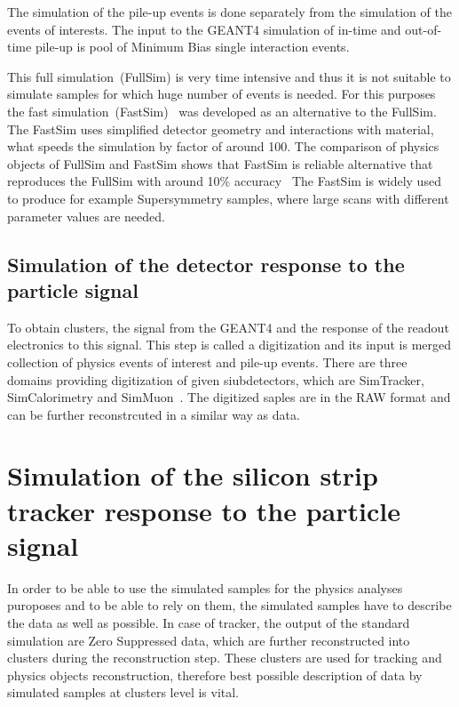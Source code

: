 The simulation of the pile-up events is done separately from the simulation of the events of interests. The input to  the GEANT4 simulation of in-time and out-of-time pile-up is pool of Minimum Bias single interaction events.

This full simulation~(FullSim) is very time intensive and thus it is not suitable to simulate samples for which huge number of events is needed. For this purposes the fast simulation~(FastSim)~\cite{Sekmen:2017hzs, CMS:2010spa, Giammanco:2014bza} was developed as an alternative to the FullSim. The FastSim uses simplified detector geometry and interactions with material, what speeds the simulation by factor of around 100. The comparison of physics objects of FullSim and FastSim shows that FastSim is reliable alternative that reproduces the FullSim with around 10\% accuracy~\cite{Abdullin:2011zz, Sekmen:2017hzs} The FastSim is widely used to produce for example Supersymmetry samples, where large scans with different parameter values are needed. 

\subsection{Simulation of the detector response to the particle signal}

To obtain clusters, the signal from the GEANT4 and the response of the readout electronics to this signal. This step is called a digitization and its input is merged collection of physics events of interest and pile-up events. There are three domains providing digitization of given siubdetectors, which are SimTracker, SimCalorimetry and SimMuon~\cite{iwebsite:simdigi}. The digitized saples are in the RAW format and can be further reconstrcuted in a similar way as data.

\newpage

\section{Simulation of the silicon strip tracker response to the particle signal}

In order to be able to use the simulated samples for the physics analyses puroposes and to be able to rely on them, the simulated samples have to describe the data as well as possible. In case of tracker, the output of the standard simulation are Zero Suppressed data, which are further reconstructed into clusters during the reconstruction step. These clusters are used for tracking and physics objects reconstruction, therefore best possible description of data by simulated samples at clusters level is vital.

